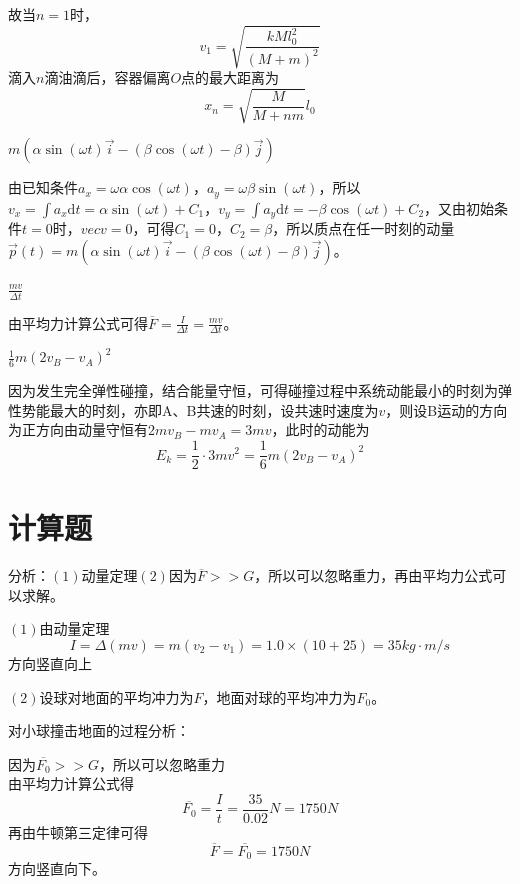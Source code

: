 \documentclass[b5paper,opensource]{qyxf-book}
\newcommand{\di}[1]{\mathrm{d}#1}
\begin{document}
故当$n=1$时，
\begin{equation*}
v_1=\sqrt{\frac{kMl_0^2}{(M+m)^2}}
\end{equation*}
滴入$n$滴油滴后，容器偏离$O$点的最大距离为
\begin{equation*}
x_n=\sqrt{\frac{M}{M+nm}}l_0
\end{equation*}

$m(\alpha\sin(\omega t)\vec{i}-(\beta\cos(\omega t)-\beta)\vec{j})$

由已知条件$a_x=\omega\alpha\cos(\omega t)，a_y=\omega\beta\sin(\omega t)$，所以$v_x=\int a_x\di t=\alpha\sin(\omega t)+C_1，v_y=\int a_y\di t=-\beta\cos(\omega t)+C_2$，又由初始条件$t=0$时，$vec{v}=0$，可得$C_1=0，C_2=\beta$，所以质点在任一时刻的动量$\vec{p}(t)=m(\alpha\sin(\omega t)\vec{i}-(\beta\cos(\omega t)-\beta)\vec{j})$。
			
$\frac{mv}{\Delta t}$
			
由平均力计算公式可得$\overline{F}=\frac{I}{\Delta t}=\frac{mv}{\Delta t}$。

$\frac{1}{6}m(2v_B-v_A)^2$
			
因为发生完全弹性碰撞，结合能量守恒，可得碰撞过程中系统动能最小的时刻为弹性势能最大的时刻，亦即A、B共速的时刻，设共速时速度为$v$，则设B运动的方向为正方向由动量守恒有$2mv_B-mv_A=3mv$，此时的动能为
\begin{equation*}
E_k=\frac{1}{2}\cdot 3mv^2=\frac{1}{6}m(2v_B-v_A)^2
\end{equation*}

\section{计算题}
\analysis 分析：$(1)$动量定理$(2)$因为$\overline{F}>>G$，所以可以忽略重力，再由平均力公式可以求解。

\solve $(1)$由动量定理
\begin{equation*}
I=\Delta(mv)=m(v_2-v_1)=1.0\times(10+25)=35kg\cdot m/s
\end{equation*}
方向竖直向上

$(2)$设球对地面的平均冲力为$F$，地面对球的平均冲力为$F_0$。

对小球撞击地面的过程分析：

因为$\overline{F_0}>>G$，所以可以忽略重力\\
由平均力计算公式得
\begin{equation*}
\overline{F_0}=\frac{I}{t}=\frac{35}{0.02}N=1750N
\end{equation*}
再由牛顿第三定律可得
\begin{equation*}
\overline{F}=\overline{F_0}=1750N
\end{equation*}
方向竖直向下。
\end{document}
